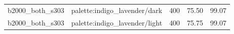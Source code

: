\begin{longtable}{l>{\raggedright\arraybackslash}p{.42\linewidth}rrr}
b2000\_\allowbreak{}both\_\allowbreak{}s303 & %
palette:indigo\_\allowbreak{}lavender/dark & %
400 & %
75.50 & %
99.07 \\ %

b2000\_\allowbreak{}both\_\allowbreak{}s303 & %
palette:indigo\_\allowbreak{}lavender/light & %
400 & %
75.75 & %
99.07 \\ %


\end{longtable}
